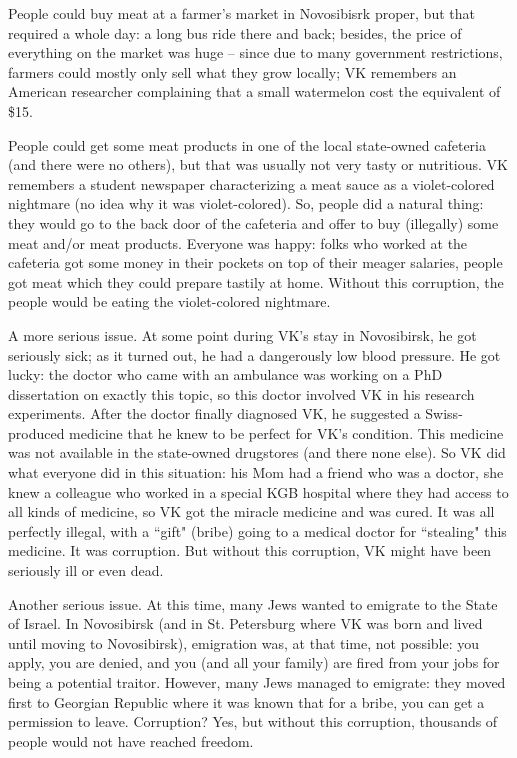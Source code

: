 \documentclass{article}
\begin{document}
People could buy meat at a farmer's market in Novosibisrk proper, but that
required a whole day: a long bus ride there and back; besides, the
price of everything on the market was huge -- since due to many
government restrictions, farmers could mostly only sell what they
grow locally; VK remembers an American researcher complaining that a
small watermelon cost the equivalent of \$15.

People could get some meat products in one of the local state-owned
cafeteria (and there were no others), but that was usually not
very tasty or nutritious. VK remembers a student newspaper
characterizing a meat sauce as a violet-colored nightmare (no
idea why it was violet-colored). So, people did a natural
thing: they would go to the back door of the cafeteria and offer to
buy (illegally) some meat and/or meat products.
Everyone was happy: folks who worked at the cafeteria got some money in their pockets on top of
their meager salaries, people got meat which they could prepare tastily at
home. Without this corruption, the people would be eating the
violet-colored nightmare.

A more serious issue. At some point during VK's stay in
Novosibirsk, he got seriously sick; as it turned out, he had a
dangerously low blood pressure. He got lucky: the doctor who came
with an ambulance was working on a PhD dissertation on exactly
this topic, so this doctor involved VK in his research experiments. After
the doctor finally diagnosed VK, he suggested a Swiss-produced medicine
that he knew to be perfect for VK's condition. This medicine was not
available in the state-owned drugstores (and there none else). So VK did
what everyone did in this situation: his Mom had a friend who was a
doctor, she knew a colleague who worked in a special KGB hospital
where they had access to all kinds of medicine, so VK got the
miracle medicine and was cured. It was all perfectly illegal,
with a ``gift" (bribe) going to a medical doctor for ``stealing"
this medicine. It was corruption. But without this
corruption, VK might have been seriously ill or even dead.

Another serious issue. At this time, many Jews wanted to emigrate
to the State of Israel. In Novosibirsk (and in St. Petersburg
where VK was born and lived until moving to Novosibirsk),
emigration was, at that time, not possible: you apply, you are
denied, and you (and all your family) are fired from your jobs
for being a potential traitor. However, many Jews managed to
emigrate: they moved first to Georgian Republic where it was known
that for a bribe, you can get a permission to leave. Corruption?
Yes, but without this corruption, thousands of people would not
have reached freedom.
\end{document}
